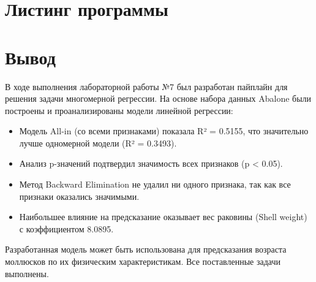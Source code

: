 \section{Листинг программы}



\section*{Вывод}

В ходе выполнения лабораторной работы №7 был разработан пайплайн для решения задачи многомерной регрессии. На основе набора данных Abalone были построены и проанализированы модели линейной регрессии:

\begin{itemize}
    \item Модель All-in (со всеми признаками) показала R² = 0.5155, что значительно лучше одномерной модели (R² = 0.3493).
    \item Анализ p-значений подтвердил значимость всех признаков (p < 0.05).
    \item Метод Backward Elimination не удалил ни одного признака, так как все признаки оказались значимыми.
    \item Наибольшее влияние на предсказание оказывает вес раковины (Shell weight) с коэффициентом 8.0895.
\end{itemize}

Разработанная модель может быть использована для предсказания возраста моллюсков по их физическим характеристикам. Все поставленные задачи выполнены.

\endinput